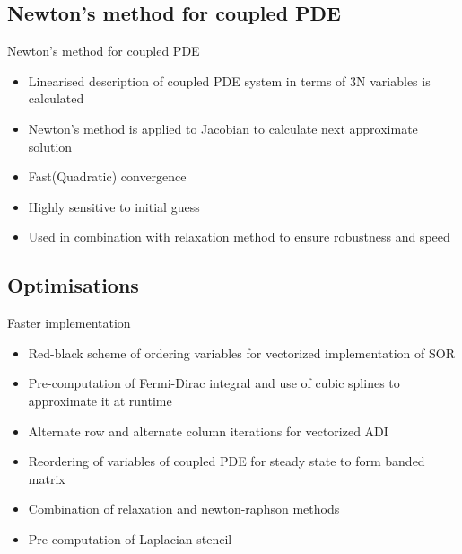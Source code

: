 \documentclass{beamer}
\begin{document}
\subsection{Newton's method for coupled PDE}
\begin{frame}{Newton's method for coupled PDE}
\begin{itemize}
	\item Linearised description of coupled PDE system in terms of 3N variables is calculated  
	\item Newton's method is applied to Jacobian to calculate next approximate solution 
	\item Fast(Quadratic) convergence
	\item Highly sensitive to initial guess
	\item Used in combination with relaxation method to ensure robustness and speed 
\end{itemize}  
\end{frame}

\subsection{Optimisations}
\begin{frame}{Faster implementation}
\begin{itemize}
  \item Red-black scheme of ordering variables for vectorized implementation of SOR
  \item Pre-computation of Fermi-Dirac integral and use of cubic splines to approximate it at runtime
  \item Alternate row and alternate column iterations for vectorized ADI 
  \item Reordering of variables of coupled PDE for steady state to form banded matrix
  \item Combination of relaxation and newton-raphson methods
  \item Pre-computation of Laplacian stencil 
\end{itemize}
\end{frame}
\end{document}
